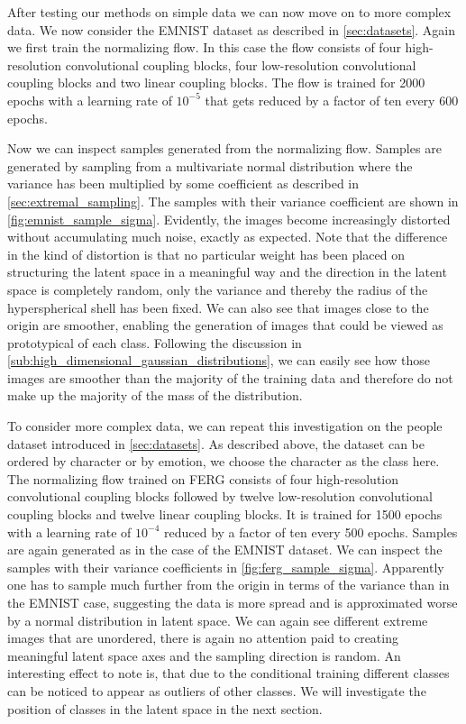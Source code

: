 After testing our methods on simple data we can now move on to more complex
data. We now consider the EMNIST dataset as described in
\autoref{sec:datasets}. Again we first train the normalizing flow. In this case
the flow consists of four high-resolution convolutional coupling blocks, four
low-resolution convolutional coupling blocks and two linear coupling blocks.
The flow is trained for 2000 epochs with a learning rate of $10^{-5}$ that gets
reduced by a factor of ten every 600 epochs.

Now we can inspect samples generated from the normalizing flow. Samples are
generated by sampling from a multivariate normal distribution where the
variance has been multiplied by some coefficient as described in
\autoref{sec:extremal_sampling}. The samples with their variance coefficient
are shown in \autoref{fig:emnist_sample_sigma}. Evidently, the images
become increasingly distorted without accumulating much noise, exactly as
expected. Note that the difference in the kind of distortion is that no
particular weight has been placed on structuring the latent space in a
meaningful way and the direction in the latent space is completely random, only
the variance and thereby the radius of the hyperspherical shell has been fixed.
We can also see that images close to the origin are smoother, enabling the
generation of images that could be viewed as prototypical of each class.
Following the discussion in
\autoref{sub:high_dimensional_gaussian_distributions}, we can
easily see how those images are smoother than the majority of the training data
and therefore do not make up the majority of the mass of the distribution.

To consider more complex data, we can repeat this investigation on the people
dataset introduced in \autoref{sec:datasets}. As described above, the dataset
can be ordered by character or by emotion, we choose the character as the class
here. The normalizing flow trained on FERG consists of four high-resolution
convolutional coupling blocks followed by twelve low-resolution convolutional
coupling blocks and twelve linear coupling blocks. It is trained for 1500
epochs with a learning rate of $10^{-4}$ reduced by a factor of ten every 500
epochs. Samples are again generated as in the case of the EMNIST dataset. We
can inspect the samples with their variance coefficients in
\autoref{fig:ferg_sample_sigma}. Apparently one has to sample
much further from the origin in terms of the variance than in the EMNIST case,
suggesting the data is more spread and is approximated worse by a normal
distribution in latent space. We can again see different extreme images that
are unordered, there is again no attention paid to creating meaningful
latent space axes and the sampling direction is random. An interesting effect
to note is, that due to the conditional training different classes can be
noticed to appear as outliers of other classes. We will investigate the
position of classes in the latent space in the next section.

